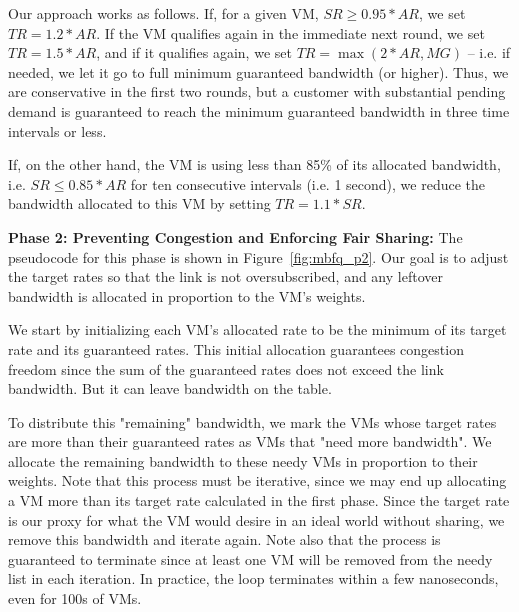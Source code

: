 Our approach works as follows.  If, for a given VM, $SR \geq 0.95*AR$, we set
$TR = 1.2*AR$.  If the VM qualifies again in the immediate next round, we set
$TR = 1.5*AR$, and if it qualifies again, we set $TR = \max(2*AR, MG)$ -- i.e.
if needed, we let it go to full minimum guaranteed bandwidth (or higher).  Thus,
we are conservative in the first two rounds, but a customer with substantial
pending demand is guaranteed to reach the minimum guaranteed bandwidth in three
time intervals or less.

If, on the other hand, the VM is using less than 85\% of its allocated
bandwidth, i.e. $SR \leq 0.85*AR$ for ten consecutive intervals (i.e. 1 second),
we reduce the bandwidth allocated to this VM by setting $TR = 1.1*SR$. 

{\bf Phase 2:  Preventing Congestion and Enforcing Fair Sharing:} The pseudocode
for this phase is shown in Figure~\ref{fig:mbfq_p2}. Our goal is to adjust the
target rates so that the link is not oversubscribed, and any leftover bandwidth
is allocated in proportion to the VM's weights.

We start by initializing each VM's allocated rate to be the minimum of its
target rate and its guaranteed rates.  This initial allocation guarantees
congestion freedom since the sum of the guaranteed rates does not exceed the
link bandwidth.  But it can leave bandwidth on the table.

To distribute this "remaining" bandwidth, we mark the VMs whose target rates are
more than their guaranteed rates as VMs that "need more bandwidth".  We allocate
the remaining bandwidth to these needy VMs in proportion to their weights.  Note
that this process must be iterative, since we may end up allocating a VM more
than its target rate calculated in the first phase.  Since the target rate is
our proxy for what the VM would desire in an ideal world without sharing, we
remove this bandwidth and iterate again.  Note also that the process is
guaranteed to terminate since at least one VM will be removed from the needy
list in each iteration. In practice, the loop terminates within a few
nanoseconds, even for 100s of VMs.

